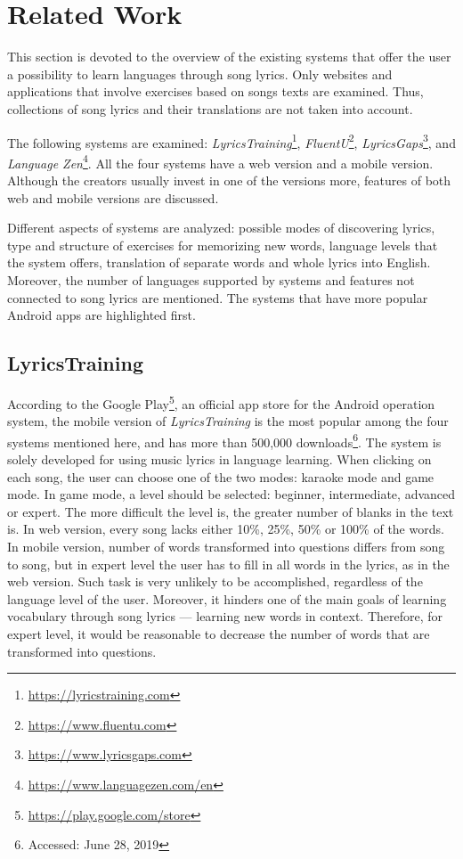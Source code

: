 \chapter{Related Work}
\label{sec:related-work}

This section is devoted to the overview of the existing systems that offer the user a possibility to learn languages through song lyrics. Only websites and applications that involve exercises based on songs texts are examined. Thus, collections of song lyrics and their translations are not taken into account.

The following systems are examined: \textit{LyricsTraining}\footnote{\url{https://lyricstraining.com}}, \textit{FluentU}\footnote{\url{https://www.fluentu.com}}, \textit{LyricsGaps}\footnote{\url{https://www.lyricsgaps.com}}, and \textit{Language Zen}\footnote{\url{https://www.languagezen.com/en}}. All the four systems have a web version and a mobile version. Although the creators usually invest in one of the versions more, features of both web and mobile versions are discussed.

Different aspects of systems are analyzed: possible modes of discovering lyrics, type and structure of exercises for memorizing new words, language levels that the system offers, translation of separate words and whole lyrics into English. Moreover, the number of languages supported by systems and features not connected to song lyrics are mentioned. The systems that have more popular Android apps are highlighted first.

\section{LyricsTraining}

According to the Google Play\footnote{\url{https://play.google.com/store}}, an official app store for the Android operation system, the mobile version of \textit{LyricsTraining} is the most popular among the four systems mentioned here, and has more than 500,000 downloads\footnote{Accessed: June 28, 2019}. The system is solely developed for using music lyrics in language learning. When clicking on each song, the user can choose one of the two modes: karaoke mode and game mode. In game mode, a level should be selected: beginner, intermediate, advanced or expert. The more difficult the level is, the greater number of blanks in the text is. In web version, every song lacks either 10\%, 25\%, 50\% or 100\% of the words. In mobile version, number of words transformed into questions differs from song to song, but in expert level the user has to fill in all words in the lyrics, as in the web version. Such task is very unlikely to be accomplished, regardless of the language level of the user. Moreover, it hinders one of the main goals of learning vocabulary through song lyrics --- learning new words in context. Therefore, for expert level, it would be reasonable to decrease the number of words that are transformed into questions.

